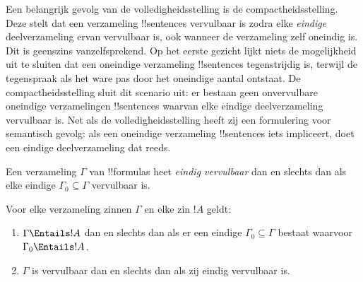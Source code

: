 \documentclass[openany]{memoir}
\begin{document}
      {}
      {}


Een belangrijk gevolg van de volledigheidsstelling is de
compactheidsstelling. Deze stelt dat een verzameling !!{sentence}s
vervulbaar is zodra elke \emph{eindige} deelverzameling ervan vervulbaar
is, ook wanneer de verzameling zelf oneindig is. Dit is geenszins
vanzelfsprekend. Op het eerste gezicht lijkt niets de mogelijkheid uit
te sluiten dat een oneindige verzameling !!{sentence}s tegenstrijdig is,
terwijl de tegenspraak als het ware pas door het oneindige aantal
ontstaat. De compactheidsstelling sluit dit scenario uit: er bestaan
geen onvervulbare oneindige verzamelingen !!{sentence}s waarvan elke
eindige deelverzameling vervulbaar is. Net als de volledigheidsstelling
heeft zij een formulering voor semantisch gevolg: als een oneindige
verzameling !!{sentence}s iets impliceert, doet een eindige
deelverzameling dat reeds.

\begin{defn}
  Een verzameling $\Gamma$ van !!{formula}s heet \emph{eindig
  vervulbaar} dan en slechts dan als elke eindige
  $\Gamma_0 \subseteq \Gamma$ vervulbaar is.
\end{defn}

\begin{thm}[Compactheidsstelling]
Voor elke verzameling zinnen $\Gamma$ en elke zin $!A$ geldt:
\begin{enumerate}
  \item $\Gamma \Entails !A$ dan en slechts dan als er een eindige
    $\Gamma_0 \subseteq \Gamma$ bestaat waarvoor
    $\Gamma_0 \Entails !A$.
  \item $\Gamma$ is vervulbaar dan en slechts dan als zij eindig
    vervulbaar is.
\end{enumerate}
\end{thm}
\end{document}
